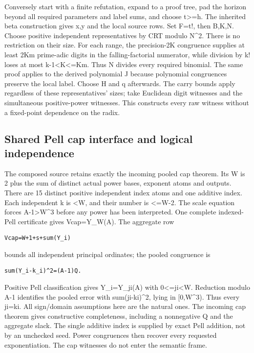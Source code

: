 Conversely start with a finite refutation, expand to a proof tree, pad the horizon beyond all required parameters and label sums, and choose t\textgreater{}\allowbreak{}=\allowbreak{}h. The inherited beta construction gives x,y and the local source rows. Set F=\allowbreak{}t!, then B,K,N. Choose positive independent representatives by CRT modulo N\textasciicircum{}\allowbreak{}2. There is no restriction on their size. For each range, the precision-2K congruence supplies at least 2Km prime-adic digits in the falling-factorial numerator, while division by k! loses at most k-1\textless{}\allowbreak{}K\textless{}\allowbreak{}=\allowbreak{}Km. Thus N divides every required binomial. The same proof applies to the derived polynomial J because polynomial congruences preserve the local label. Choose H and q afterwards. The carry bounds apply regardless of these representatives' sizes; take Euclidean digit witnesses and the simultaneous positive-power witnesses. This constructs every raw witness without a fixed-point dependence on the radix.



\subsection{Shared Pell cap interface and logical independence}



The composed source retains exactly the incoming pooled cap theorem. Its W is 2 plus the sum of distinct actual power bases, exponent atoms and outputs. There are 15 distinct positive independent index atoms and one additive index. Each independent k is \textless{}\allowbreak{}W, and their number is \textless{}\allowbreak{}=\allowbreak{}W-2. The scale equation forces A-1\textgreater{}\allowbreak{}W\textasciicircum{}\allowbreak{}3 before any power has been interpreted. One complete indexed-Pell certificate gives Vcap=\allowbreak{}Y\_\allowbreak{}W(A). The aggregate row



\begin{verbatim}
Vcap=W+1+s+sum(Y_i)
\end{verbatim}

bounds all independent principal ordinates; the pooled congruence is



\begin{verbatim}
sum(Y_i-k_i)^2=(A-1)Q.
\end{verbatim}

Positive Pell classification gives Y\_\allowbreak{}i=\allowbreak{}Y\_\allowbreak{}ji(A) with 0\textless{}\allowbreak{}=\allowbreak{}ji\textless{}\allowbreak{}W. Reduction modulo A-1 identifies the pooled error with sum(ji-ki)\textasciicircum{}\allowbreak{}2, lying in [0,W\textasciicircum{}\allowbreak{}3). Thus every ji=\allowbreak{}ki. All sign/\allowbreak{}domain assumptions here are the natural ones. The incoming cap theorem gives constructive completeness, including a nonnegative Q and the aggregate slack. The single additive index is supplied by exact Pell addition, not by an unchecked seed. Power congruences then recover every requested exponentiation. The cap witnesses do not enter the semantic frame.



